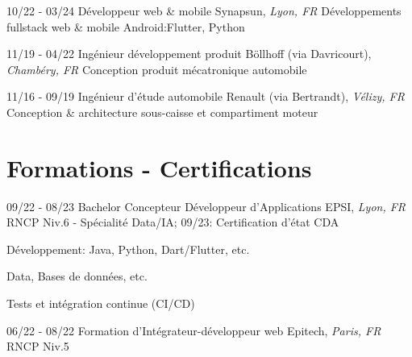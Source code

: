 \documentclass[]{friggeri-cv}
\begin{document}
\begin{entrylist}
  \entry
    {10/22 - 03/24}
    {Développeur web \& mobile}
    {Synapsun, \textit{Lyon, FR}}
    {Développements fullstack web \& mobile Android:\hspace*{8mm}Flutter, Python}
\end{entrylist}

\begin{entrylist}
  \entry
    {11/19 - 04/22}
    {Ingénieur développement produit}
    {Böllhoff (via Davricourt), \textit{Chambéry, FR}}
    {Conception produit mécatronique automobile}
\end{entrylist}

\begin{entrylist}
  \entry
    {11/16 - 09/19}
    {Ingénieur d'étude automobile}
    {Renault (via Bertrandt), \textit{Vélizy, FR}}
    {Conception \& architecture sous-caisse et compartiment moteur}
\end{entrylist}

\vspace*{-0.5cm}
\vspace*{0.45cm}
\section{Formations - Certifications}
\vspace*{-0.25cm}
\vspace{0.5mm}
\begin{entrylist}
  \entry
    {09/22 - 08/23}
    {Bachelor Concepteur Développeur d'Applications}
    {EPSI, \textit{Lyon, FR}}
    {RNCP Niv.6 - Spécialité Data/IA; \hspace{7mm} 09/23: Certification d'état CDA}
\end{entrylist}
\vspace*{-0.65cm}
\begin{itemize}
\setlength{\itemsep}{1pt}
\setlength{\parskip}{0pt}
\setlength{\parsep}{0pt}
\begin{multicols}{2}
\item Développement: \newline Java, Python, Dart/Flutter, etc.
\columnbreak
\item Data, Bases de données, etc.
\item Tests et intégration continue (CI/CD)
\end{multicols}
\end{itemize}\vspace{0.5mm}
\begin{entrylist}
  \entry
    {06/22 - 08/22}
    {Formation d'Intégrateur-développeur web}
    {Epitech, \textit{Paris, FR}}
    {RNCP Niv.5}
\end{entrylist}
\end{document}
